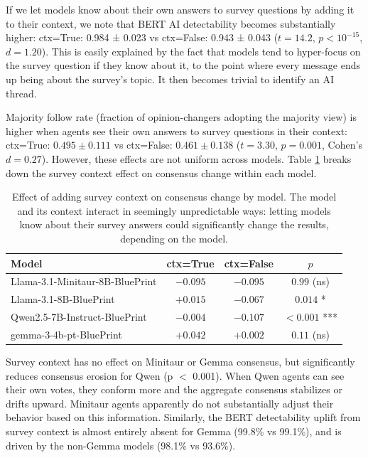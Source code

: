 \documentclass{article} %
\begin{document}
If we let models know about their own answers to survey questions by adding it to their context, we note that BERT AI detectability becomes substantially higher: ctx=True: 0.984 ± 0.023 vs ctx=False: 0.943 ± 0.043 ($t = 14.2$, $p < 10^{-15}$, $d = 1.20$). This is easily explained by the fact that models tend to hyper-focus on the survey question if they know about it, to the point where every message ends up being about the survey's topic. It then becomes trivial to identify an AI thread.

Majority follow rate (fraction of opinion-changers adopting the majority view) is higher when agents see their own answers to survey questions in their context: ctx=True: $0.495 \pm 0.111$ vs ctx=False: $0.461 \pm 0.138$ ($t = 3.30$, $p = 0.001$, Cohen's $d = 0.27$). However, these effects are not uniform across models. Table \ref{tab:context_effects} breaks down the survey context effect on consensus change within each model.

\begin{table}[h]
\centering
\begin{tabular}{lccc}
\toprule
Model & ctx=True & ctx=False & $p$ \\
\midrule
Llama-3.1-Minitaur-8B-BluePrint & $-0.095$ & $-0.095$ & $0.99$ (ns) \\
Llama-3.1-8B-BluePrint & $+0.015$ & $-0.067$ & $0.014$ * \\
Qwen2.5-7B-Instruct-BluePrint & $-0.004$ & $-0.107$ & $< 0.001$ *** \\
gemma-3-4b-pt-BluePrint & $+0.042$ & $+0.002$ & $0.11$ (ns) \\
\bottomrule
\end{tabular}
\caption{Effect of adding survey context on consensus change by model. The model and its context interact in seemingly unpredictable ways: letting models know about their survey answers could significantly change the results, depending on the model.}
\label{tab:context_effects}
\end{table}

Survey context has no effect on Minitaur or Gemma consensus, but significantly reduces consensus erosion for Qwen (p $<$ 0.001). When Qwen agents can see their own votes, they conform more and the aggregate consensus stabilizes or drifts upward. Minitaur agents apparently do not substantially adjust their behavior based on this information. Similarly, the BERT detectability uplift from survey context is almost entirely absent for Gemma (99.8\% vs 99.1\%), and is driven by the non-Gemma models (98.1\% vs 93.6\%).
\end{document}
